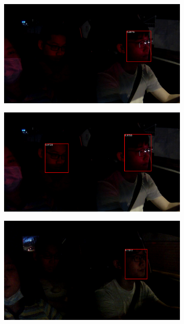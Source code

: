 \begin{figure}[t]
\begin{subfigure}[b]{0.45\textwidth}
\end{subfigure}
\begin{subfigure}[b]{0.45\textwidth}
    \includegraphics[width=\textwidth]{figures/comp_base4}
\end{subfigure}
\begin{subfigure}[b]{0.45\textwidth}
    \includegraphics[width=\textwidth]{figures/comp_ours4}
\end{subfigure}
\begin{subfigure}[b]{0.45\textwidth}
    \includegraphics[width=\textwidth]{figures/comp_base5}

\end{subfigure}
\end{figure}
